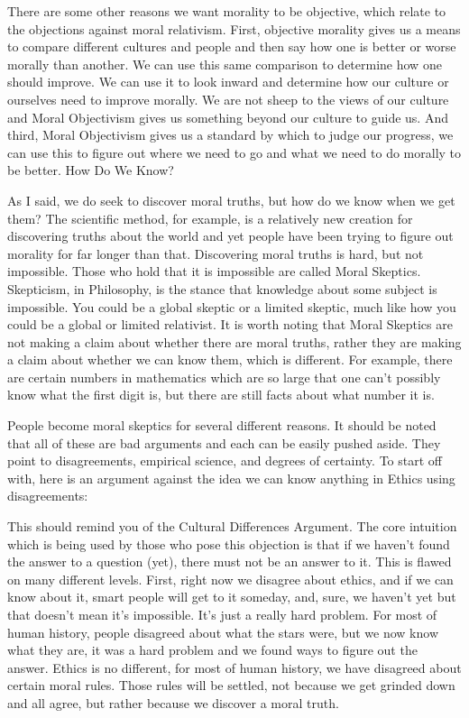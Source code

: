 There are some other reasons we want morality to be objective, which relate to the objections against moral relativism. First, objective morality gives us a means to compare different cultures and people and then say how one is better or worse morally than another. We can use this same comparison to determine how one should improve. We can use it to look inward and determine how our culture or ourselves need to improve morally. We are not sheep to the views of our culture and Moral Objectivism gives us something beyond our culture to guide us. And third, Moral Objectivism gives us a standard by which to judge our progress, we can use this to figure out where we need to go and what we need to do morally to be better.  
How Do We Know?

As I said, we do seek to discover moral truths, but how do we know when we get them? The scientific method, for example, is a relatively new creation for discovering truths about the world and yet people have been trying to figure out morality for far longer than that. Discovering moral truths is hard, but not impossible. Those who hold that it is impossible are called Moral Skeptics. Skepticism, in Philosophy, is the stance that knowledge about some subject is impossible. You could be a global skeptic or a limited skeptic, much like how you could be a global or limited relativist. It is worth noting that Moral Skeptics are not making a claim about whether there are moral truths, rather they are making a claim about whether we can know them, which is different. For example, there are certain numbers in mathematics which are so large that one can't possibly know what the first digit is, but there are still facts about what number it is.

People become moral skeptics for several different reasons. It should be noted that all of these are bad arguments and each can be easily pushed aside. They point to disagreements, empirical science, and degrees of certainty. To start off with, here is an argument against the idea we can know anything in Ethics using disagreements:


This should remind you of the Cultural Differences Argument. The core intuition which is being used by those who pose this objection is that if we haven't found the answer to a question (yet), there must not be an answer to it. This is flawed on many different levels. First, right now we disagree about ethics, and if we can know about it, smart people will get to it someday, and, sure, we haven’t yet but that doesn’t mean it’s impossible. It’s just a really hard problem. For most of human history, people disagreed about what the stars were, but we now know what they are, it was a hard problem and we found ways to figure out the answer. Ethics is no different, for most of human history, we have disagreed about certain moral rules. Those rules will be settled, not because we get grinded down and all agree, but rather because we discover a moral truth. 

